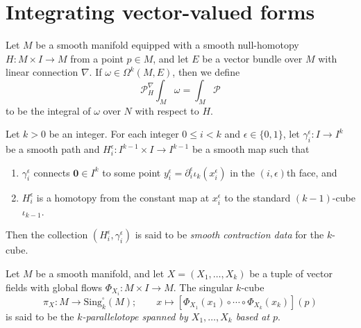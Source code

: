 \section{Integrating vector-valued forms}

\begin{definition}
  Let $M$ be a smooth manifold equipped with a smooth null-homotopy $H \colon M \times I \to M$ from a point $p \in M$, and let $E$ be a vector bundle over $M$ with linear connection $\nabla$. If $\omega \in \Omega^k(M, E)$, then we define 
  \begin{equation}
    \mathcal{P}^\nabla_{H}\!\!\int_{M} \omega = \int_{M} \mathcal{P}
  \end{equation}
  to be the integral of $\omega$ over $N$ with respect to $H$.
\end{definition}

\begin{definition}
  Let $k > 0$ be an integer. For each integer $0 \leq i < k$ and $\epsilon \in \{0, 1\}$, let $\gamma_i^\epsilon \colon I \to I^k$ be a smooth path and $H_i^\epsilon \colon I^{k-1} \times I \to I^{k-1}$ be a smooth map such that  
  \begin{enumerate}
    \item $\gamma_i^\epsilon$ connects $\mathbf{0} \in I^k$ to some point $y_i^\epsilon = \partial_i^\epsilon\iota_k(x_i^\epsilon)$ in the $(i, \epsilon)$th face, and
    \item $H_i^\epsilon$ is a homotopy from the constant map at $x_i^\epsilon$ to the standard $(k-1)$-cube $\iota_{k-1}$.
  \end{enumerate}
  Then the collection $(H_i^\epsilon, \gamma_i^\epsilon)$ is said to be \emph{smooth contraction data} for the $k$-cube.
\end{definition}

\begin{definition}
  Let $M$ be a smooth manifold, and let $X = (X_1, \ldots, X_k)$ be a tuple of vector fields with global flows $\Phi_{X_i} \colon M \times I \to M$. The singular $k$-cube 
  \begin{equation}
    \pi_X \colon M \to \mathrm{Sing}_k^{\square} (M); \quad \quad  x \mapsto \left[\Phi_{X_1}(x_1) \circ \cdots \circ \Phi_{X_k}(x_k)\right]\!(p)
  \end{equation}
  is said to be the \emph{$k$-parallelotope spanned by $X_1, \ldots, X_k$ based at $p$}.
\end{definition}

